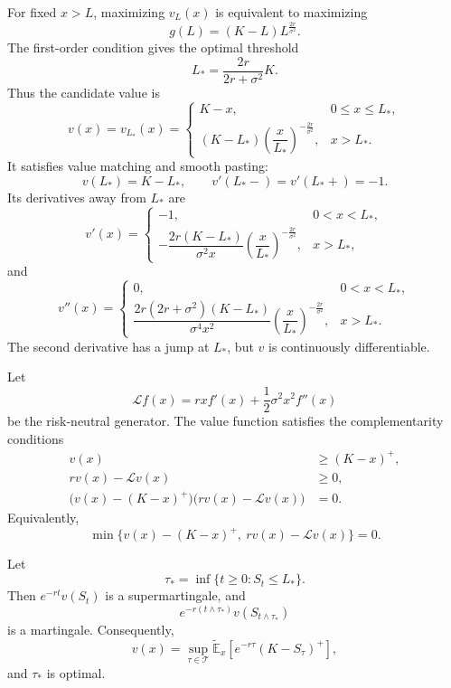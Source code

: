 For fixed $x>L$, maximizing $v_L(x)$ is equivalent to maximizing
\[
g(L)=(K-L)L^{\frac{2r}{\sigma^2}}.
\]
The first-order condition gives the optimal threshold
\[
\boxed{L_*=\frac{2r}{2r+\sigma^2}K.}
\]
Thus the candidate value is
\[
v(x)=v_{L_*}(x)
=\begin{cases}
K-x, & 0\leq x\leq L_*,\\[4pt]
(K-L_*)\left(\dfrac{x}{L_*}\right)^{-\frac{2r}{\sigma^2}},
& x>L_*.
\end{cases}
\]
It satisfies value matching and smooth pasting:
\[
v(L_*)=K-L_*,
\qquad
v'(L_*-) = v'(L_*+)=-1.
\]
Its derivatives away from $L_*$ are
\[
v'(x)
=\begin{cases}
-1, & 0<x<L_*,\\[4pt]
-\dfrac{2r(K-L_*)}{\sigma^2x}
 \left(\dfrac{x}{L_*}\right)^{-\frac{2r}{\sigma^2}},
&x>L_*,
\end{cases}
\]
and
\[
v''(x)
=\begin{cases}
0, & 0<x<L_*,\\[4pt]
\dfrac{2r(2r+\sigma^2)(K-L_*)}{\sigma^4x^2}
 \left(\dfrac{x}{L_*}\right)^{-\frac{2r}{\sigma^2}},
&x>L_*.
\end{cases}
\]
The second derivative has a jump at $L_*$, but $v$ is continuously differentiable.

Let
\[
\mathcal{L}f(x)
=rx f'(x)+\frac12\sigma^2x^2f''(x)
\]
be the risk-neutral generator. The value function satisfies the complementarity conditions
\[
\begin{aligned}
v(x)&\geq(K-x)^+,\\
rv(x)-\mathcal{L}v(x)&\geq0,\\
\bigl(v(x)-(K-x)^+\bigr)
\bigl(rv(x)-\mathcal{L}v(x)\bigr)&=0.
\end{aligned}
\]
Equivalently,
\[
\min\bigl\{v(x)-(K-x)^+,\ rv(x)-\mathcal{L}v(x)\bigr\}=0.
\]

\begin{thm}
Let
\[
\tau_*=\inf\{t\geq0:S_t\leq L_*\}.
\]
Then $e^{-rt}v(S_t)$ is a supermartingale, and
\[
e^{-r(t\wedge\tau_*)}v(S_{t\wedge\tau_*})
\]
is a martingale. Consequently,
\[
v(x)
=\sup_{\tau\in\mathcal{T}}
 \widetilde{\mathbb{E}}_x
 \left[e^{-r\tau}(K-S_\tau)^+\right],
\]
and $\tau_*$ is optimal.
\end{thm}

